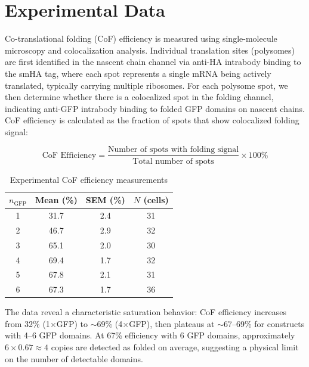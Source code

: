 \documentclass[11pt,a4paper]{article}
\begin{document}
\section{Experimental Data}

Co-translational folding (CoF) efficiency is measured using single-molecule microscopy and colocalization analysis. Individual translation sites (polysomes) are first identified in the nascent chain channel via anti-HA intrabody binding to the smHA tag, where each spot represents a single mRNA being actively translated, typically carrying multiple ribosomes. For each polysome spot, we then determine whether there is a colocalized spot in the folding channel, indicating anti-GFP intrabody binding to folded GFP domains on nascent chains. CoF efficiency is calculated as the fraction of spots that show colocalized folding signal:

\begin{equation}
\text{CoF Efficiency} = \frac{\text{Number of spots with folding signal}}{\text{Total number of spots}} \times 100\%
\end{equation}

\begin{table}[H]
\centering
\caption{Experimental CoF efficiency measurements}
\label{tab:exp_data}
\begin{tabular}{@{}cccc@{}}
\toprule
\textbf{$n_{\text{GFP}}$} & \textbf{Mean (\%)}& \textbf{SEM (\%)} & \textbf{$N$ (cells)} \\
\midrule
1 & 31.7 & 2.4 & 31 \\
2 & 46.7 & 2.9 & 32 \\
3 & 65.1 & 2.0 & 30 \\
4 & 69.4 & 1.7 & 32 \\
5 & 67.8 & 2.1 & 31 \\
6 & 67.3 & 1.7 & 36 \\
\bottomrule
\end{tabular}
\end{table}

The data reveal a characteristic saturation behavior: CoF efficiency increases from 32\% (1$\times$GFP) to $\sim$69\% (4$\times$GFP), then plateaus at $\sim$67--69\% for constructs with 4--6 GFP domains. At 67\% efficiency with 6 GFP domains, approximately $6 \times 0.67 \approx 4$ copies are detected as folded on average, suggesting a physical limit on the number of detectable domains.
\end{document}
